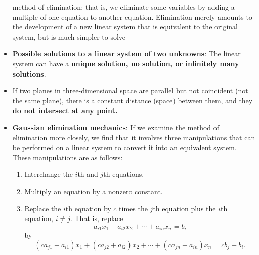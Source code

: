 \documentclass{report}
\begin{document}
\begin{itemize}
method of elimination; that is, we eliminate some variables by adding a multiple
of one equation to another equation. Elimination merely amounts to the development of a new linear system that is equivalent to the original system, but is much
simpler to solve
        \item \textbf{Possible solutions to a linear system of two unknowns}: The linear system can have a \textbf{unique solution, no solution, or infinitely many solutions}.
            \bigbreak \noindent 
            \bigbreak \noindent 
        \item  If two planes in three-dimensional space are parallel but not coincident (not the same plane), there is a constant distance (space) between them, and they \textbf{do not intersect at any point.}
        \item \textbf{Gaussian elimination mechanics}:
            \noindent If we examine the method of elimination more closely, we find that it involves three manipulations that can be performed on a linear system to convert it into an equivalent system. These manipulations are as follows:
            \begin{enumerate}
                \item Interchange the \(i\)th and \(j\)th equations.
                \item Multiply an equation by a nonzero constant.
                \item Replace the \(i\)th equation by \(c\) times the \(j\)th equation plus the \(i\)th equation, \(i \neq j\). That is, replace
                    \[
                        a_{i1}x_1 + a_{i2}x_2 + \cdots + a_{in}x_n = b_i
                    \]
                    by
                    \[
                        (ca_{j1} + a_{i1})x_1 + (ca_{j2} + a_{i2})x_2 + \cdots + (ca_{jn} + a_{in})x_n = cb_j + b_i.
                    \]
            \end{enumerate}
    \end{itemize}

    \pagebreak 
\end{document}
